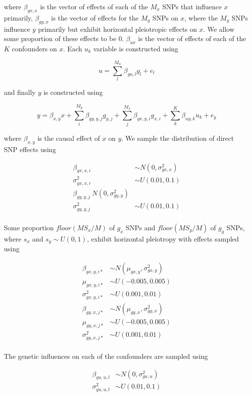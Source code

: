 \documentclass[]{article}
\begin{document}
where \(\beta_{gx,x}\) is the vector of effects of each of the \(M_x\)
SNPs that influence \(x\) primarily, \(\beta_{gy,x}\) is the vector of
effects for the \(M_y\) SNPs on \(x\), where the \(M_y\) SNPs influence
\(y\) primarily but exhibit horizontal pleiotropic effects on \(x\). We
allow some proportion of these effects to be 0. \(\beta_{ux}\) is the
vector of effects of each of the \(K\) confounders on \(x\). Each
\(u_{k}\) variable is constructed using

\[
u = \sum^{M_u}_{l}{\beta_{gu,l}g_{l}} + e_{l}
\]

and finally \(y\) is constructed using

\[
y = \beta_{x,y}x + \sum^{M_y}_{i}{\beta_{gy,y,j}g_{y,j}} + \sum^{M_x}_{j}{\beta_{gx,y,i}g_{x,i}} + \sum^{K}_{k}{\beta_{uy,k} u_{k}} + e_{y}
\]

where \(\beta_{x,y}\) is the causal effect of \(x\) on \(y\). We sample
the distribution of direct SNP effects using

\[
\begin{aligned}
\beta_{gx,x,i} & \sim N(0, \sigma^2_{gx,x}) \\
\sigma^2_{gx,x,i} & \sim U(0.01, 0.1) \\
\beta_{gy,y,j} ~ N(0, \sigma^2_{gy,y}) \\
\sigma^2_{gy,y,j} & \sim U(0.01, 0.1) \\
\end{aligned}
\]

Some proportion \(floor(MS_{x}/M)\) of \(g_x\) SNPs and
\(floor(MS_{y}/M)\) of \(g_y\) SNPs, where \(s_x\) and
\(s_y \sim U(0,1)\), exhibit horizontal pleiotropy with effects sampled
using

\[
\begin{aligned}
\beta_{gx,y,i*} & \sim N(\mu_{gx,y}, \sigma^2_{gx,y})  \\
\mu_{gx,y,i*} & \sim U(-0.005, 0.005) \\
\sigma^2_{gx,y,i*} & \sim U(0.001, 0.01) \\
\beta_{gy,x,j*} & \sim N(\mu_{gy,x}, \sigma^2_{gy,x}) \\
\mu_{gy,x,j*} & \sim U(-0.005, 0.005) \\
\sigma^2_{gy,x,j*} & \sim U(0.001, 0.01) \\
\end{aligned}
\]

The genetic influences on each of the confounders are sampled using

\[
\begin{aligned}
\beta_{gu,u,l} & \sim N(0, \sigma^2_{gu,u}) \\
\sigma^2_{gu,u,l} & \sim U(0.01, 0.1) \\
\end{aligned}
\]
\end{document}
